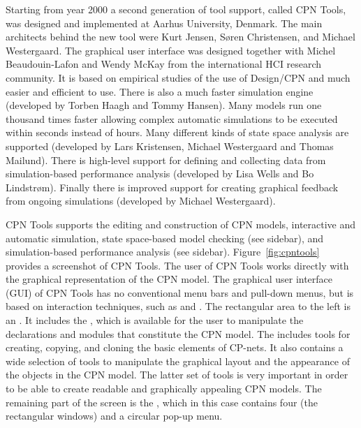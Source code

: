Starting from year 2000 a second generation of tool support, called
CPN Tools, was designed and implemented at Aarhus University,
Denmark. The main architects behind the new tool were Kurt Jensen,
S\o{}ren Christensen, and Michael Westergaard. The graphical user
interface was designed together with Michel Beaudouin-Lafon and Wendy
McKay from the international HCI research community. It is based on
empirical studies of the use of Design/CPN and much easier and
efficient to use. There is also a much faster simulation engine
(developed by Torben Haagh and Tommy Hansen). Many models run one
thousand times faster allowing complex automatic simulations to be
executed within seconds instead of hours. Many different kinds of
state space analysis are supported (developed by Lars Kristensen,
Michael Westergaard and Thomas Mailund). There is high-level support
for defining and collecting data from simulation-based performance
analysis (developed by Lisa Wells and Bo Lindstrøm). Finally there is
improved support for creating graphical feedback from ongoing
simulations (developed by Michael Westergaard).

CPN Tools supports the editing and construction of CPN models,
interactive and automatic simulation, state space-based model checking
(see sidebar), and simulation-based performance analysis (see
sidebar). Figure~\ref{fig:cpntools} provides a screenshot of CPN
Tools. The user of CPN Tools works directly with the graphical
representation of the CPN model. The graphical user interface (GUI) of
CPN Tools has no conventional menu bars and pull-down menus, but is
based on interaction techniques, such as  and
. The rectangular area to the left is an
. It includes the , which is
available for the user to manipulate the declarations and modules that
constitute the CPN model. The  includes tools for
creating, copying, and cloning the basic elements of CP-nets. It also
contains a wide selection of tools to manipulate the graphical layout
and the appearance of the objects in the CPN model. The latter set of
tools is very important in order to be able to create readable and
graphically appealing CPN models. The remaining part of the screen is
the , which in this case contains four
 (the rectangular windows) and a circular pop-up
menu.

